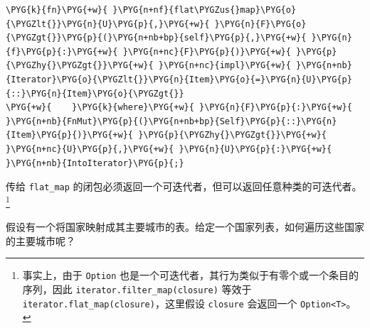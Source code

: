 \begin{Verbatim}[commandchars=\\\{\},breaklines=true,breakanywhere=true,fontsize=\codefont,xleftmargin=17bp]
\PYG{k}{fn}\PYG{+w}{ }\PYG{n+nf}{flat\PYGZus{}map}\PYG{o}{\PYGZlt{}}\PYG{n}{U}\PYG{p}{,}\PYG{+w}{ }\PYG{n}{F}\PYG{o}{\PYGZgt{}}\PYG{p}{(}\PYG{n+nb+bp}{self}\PYG{p}{,}\PYG{+w}{ }\PYG{n}{f}\PYG{p}{:}\PYG{+w}{ }\PYG{n+nc}{F}\PYG{p}{)}\PYG{+w}{ }\PYG{p}{\PYGZhy{}\PYGZgt{}}\PYG{+w}{ }\PYG{n+nc}{impl}\PYG{+w}{ }\PYG{n+nb}{Iterator}\PYG{o}{\PYGZlt{}}\PYG{n}{Item}\PYG{o}{=}\PYG{n}{U}\PYG{p}{::}\PYG{n}{Item}\PYG{o}{\PYGZgt{}}
\PYG{+w}{    }\PYG{k}{where}\PYG{+w}{ }\PYG{n}{F}\PYG{p}{:}\PYG{+w}{ }\PYG{n+nb}{FnMut}\PYG{p}{(}\PYG{n+nb+bp}{Self}\PYG{p}{::}\PYG{n}{Item}\PYG{p}{)}\PYG{+w}{ }\PYG{p}{\PYGZhy{}\PYGZgt{}}\PYG{+w}{ }\PYG{n+nc}{U}\PYG{p}{,}\PYG{+w}{ }\PYG{n}{U}\PYG{p}{:}\PYG{+w}{ }\PYG{n+nb}{IntoIterator}\PYG{p}{;}
\end{Verbatim}

传给 \texttt{flat\_map} 的闭包必须返回一个可迭代者，但可以返回任意种类的可迭代者。\footnote{事实上，由于 \texttt{Option} 也是一个可迭代者，其行为类似于有零个或一个条目的序列，因此 \texttt{iterator.filter\_map(closure)} 等效于 \texttt{iterator.flat\_map(closure)}，这里假设 \texttt{closure} 会返回一个 \texttt{Option<T>}。}

假设有一个将国家映射成其主要城市的表。给定一个国家列表，如何遍历这些国家的主要城市呢？

